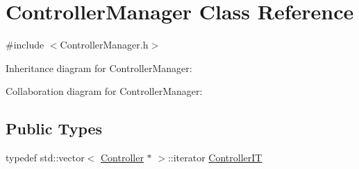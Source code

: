 \hypertarget{classControllerManager}{}\section{Controller\+Manager Class Reference}
\label{classControllerManager}


{\ttfamily \#include $<$Controller\+Manager.\+h$>$}



Inheritance diagram for Controller\+Manager\+:


Collaboration diagram for Controller\+Manager\+:
\subsection*{Public Types}
\begin{DoxyCompactItemize}
\item 
typedef std\+::vector$<$ \hyperlink{classController}{Controller} $\ast$ $>$\+::iterator \hyperlink{classControllerManager_a0f09bc96bcff03cab101dabf6a661959}{Controller\+IT}
\end{DoxyCompactItemize}
